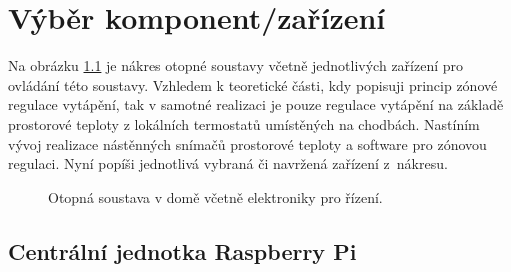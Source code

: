 \chapter{Výběr komponent/zařízení}

Na obrázku \ref{fig:otopna-soustava-a-elektronika-rez-domu} je nákres otopné soustavy včetně jednotlivých zařízení pro ovládání této soustavy. Vzhledem k teoretické části, kdy popisuji princip zónové regulace vytápění, tak v samotné realizaci je pouze regulace vytápění na základě prostorové teploty z lokálních termostatů umístěných na chodbách. Nastíním vývoj realizace nástěnných snímačů prostorové teploty a software pro zónovou regulaci. Nyní popíši jednotlivá vybraná či navržená zařízení z~nákresu. 

\newpage

\begin{figure}[H]
    \centering
    \def\svgwidth{\columnwidth}
    
    \caption{Otopná soustava v domě včetně elektroniky pro řízení.}
    \label{fig:otopna-soustava-a-elektronika-rez-domu}
\end{figure}


\section{Centrální jednotka Raspberry Pi}

